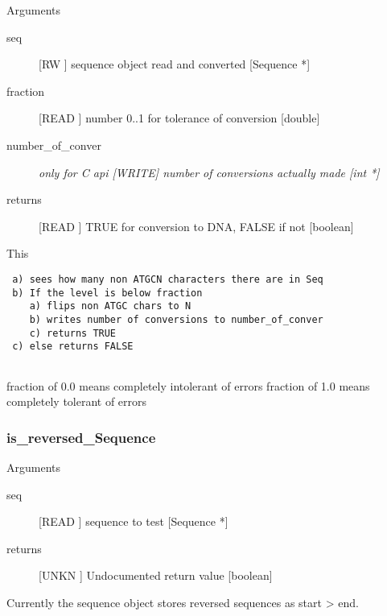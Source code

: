 Arguments
\begin{description}
\item[seq] [RW   ] sequence object read and converted  [Sequence *]
\item[fraction] [READ ] number 0..1 for tolerance of conversion [double]
\item[number_of_conver] \em{only for C api} [WRITE] number of conversions actually made [int *]
\item[returns] [READ ] TRUE for conversion to DNA, FALSE if not [boolean]
\end{description}
This 
\begin{verbatim}
 a) sees how many non ATGCN characters there are in Seq
 b) If the level is below fraction
    a) flips non ATGC chars to N
    b) writes number of conversions to number_of_conver
    c) returns TRUE
 c) else returns FALSE


\end{verbatim}
fraction of 0.0 means completely intolerant of errors
fraction of 1.0 means completely tolerant of errors




\subsubsection{is_reversed_Sequence}

Arguments
\begin{description}
\item[seq] [READ ] sequence to test [Sequence *]
\item[returns] [UNKN ] Undocumented return value [boolean]
\end{description}
Currently the sequence object stores 
reversed sequences as start > end.


